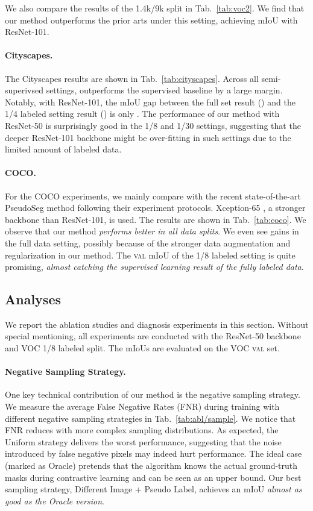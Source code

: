 We also compare the results of the 1.4k/9k split in Tab.~\ref{tab:voc2}.
We find that our method outperforms the prior arts under this setting, achieving  mIoU with ResNet-101.


\paragraph{Cityscapes.}
The Cityscapes results are shown in Tab.~\ref{tab:cityscapes}. Across all semi-superivsed settings, \ours{} outperforms the supervised baseline by a large margin. Notably, with ResNet-101, the mIoU gap between the full set result () and the 1/4 labeled setting result () is only . The performance of our method with ResNet-50 is surprisingly good in the 1/8 and 1/30 settings, suggesting that the deeper ResNet-101 backbone might be over-fitting in such settings due to the limited amount of labeled data.


\paragraph{COCO.}
For the COCO experiments, we mainly compare with the recent state-of-the-art PseudoSeg method \cite{zou2020pseudoseg} following their experiment protocols. Xception-65 \cite{chollet2017xception}, a stronger backbone than ResNet-101, is used. The results are shown in Tab.~\ref{tab:coco}. We observe that our method {\em performs better in all data splits}. We even see gains in the full data setting, possibly because of the stronger data augmentation and regularization in our method. The \textsc{val} mIoU of the 1/8 labeled setting is quite promising, {\em almost catching the supervised learning result of the fully labeled data}.



\subsection{Analyses}
\label{sec:exp/analysis}

We report the ablation studies and diagnosis experiments in this section. Without special mentioning, all experiments are conducted with the ResNet-50 backbone and VOC 1/8 labeled split. The mIoUs are evaluated on the VOC \textsc{val} set.


\paragraph{Negative Sampling Strategy.}
One key technical contribution of our method is the negative sampling strategy.
We measure the average False Negative Rates (FNR) during training with different negative sampling strategies in Tab.~\ref{tab:abl/sample}. 
We notice that FNR reduces with more complex sampling distributions. As expected, the Uniform strategy delivers the worst performance, suggesting that the noise introduced by false negative pixels may indeed hurt performance. The ideal case (marked as Oracle) pretends that the algorithm knows the actual ground-truth masks during contrastive learning and can be seen as an upper bound. Our best sampling strategy, Different Image + Pseudo Label, achieves an mIoU {\em almost as good as the Oracle version}.

